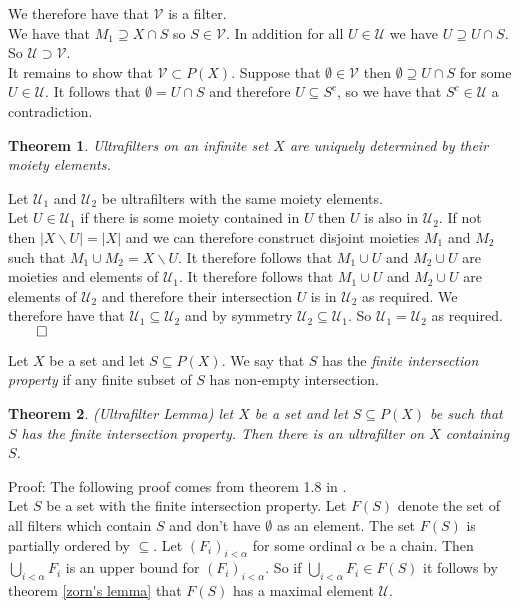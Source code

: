 \documentclass{report}
\newtheorem{theorem}{Theorem}[section]
\newenvironment{defn}[1][]{\refstepcounter{theorem}\begin{trivlist}
\item[\hskip \labelsep {\bfseries Definition  \thetheorem  \, \def\temp{#1}\ifx\temp\empty  #1\else  (#1)\fi
}]}   {\end{trivlist}}
\begin{document}
We therefore have that $\mathcal{V}$ is a filter.\\
We have that $M_1 \supseteq X\cap S$ so $S \in \mathcal{V}$. In addition for all $U\in \mathcal{U}$ we have $U\supseteq U\cap S$. So $\mathcal{U} \supset \mathcal{V}$.\\
It remains to show that $\mathcal{V} \subset P(X)$. Suppose that $\emptyset \in \mathcal{V}$ then $\emptyset \supseteq U\cap S$ for some $U\in \mathcal{U}$. It follows that $\emptyset = U\cap S$ and therefore $U\subseteq S^c$, so we have that $S^c\in \mathcal{U}$ a contradiction.
\begin{theorem}\label{moiety determined}
Ultrafilters on an infinite set $X$ are uniquely determined by their moiety elements.
\end{theorem}\par
Let $\mathcal{U}_1$ and $\mathcal{U}_2$ be ultrafilters with the same moiety elements.\\
Let $U \in \mathcal{U}_1$ if there is some moiety contained in $U$ then $U$ is also in $\mathcal{U}_2$. If not then $\vert X \backslash U \vert = \vert X \vert$ and we can therefore construct disjoint moieties $M_1$ and $M_2$ such that $M_1 \cup M_2 = X \backslash U $. It therefore follows that $M_1 \cup U$ and $M_2 \cup U$ are moieties and elements of $\mathcal{U}_1$. It therefore follows that $M_1 \cup U$ and $M_2 \cup U$ are elements of $\mathcal{U}_2$ and therefore their intersection $U$ is in $\mathcal{U}_2$ as required. We therefore have that $\mathcal{U}_1 \subseteq \mathcal{U}_2$ and by symmetry $\mathcal{U}_2 \subseteq \mathcal{U}_1$. So $\mathcal{U}_1 = \mathcal{U}_2$ as required. $\qed$
\begin{defn}
Let $X$ be a set and let $S \subseteq P(X)$. We say that $S$ has the \textit{finite intersection property} if any finite subset of $S$ has non-empty intersection.
\end{defn}
\begin{theorem}\label{ultrafilter lemma}
(Ultrafilter Lemma) let $X$ be a set and let $S \subseteq P(X)$ be such that $S$ has the finite intersection property. Then there is an ultrafilter on $X$ containing $S$.
\end{theorem}\par
Proof: The following proof comes from theorem 1.8 in \cite{no ultrafilters}.\\ Let $S$ be a set with the finite intersection property. Let $F(S)$ denote the set of all filters which contain $S$ and don't have $\emptyset$ as an element. The set $F(S)$ is partially ordered by $\subseteq$. Let $(F_i)_{i<\alpha}$ for some ordinal $\alpha$ be a chain. Then $\bigcup_{i<\alpha} F_i$ is an upper bound for $(F_i)_{i<\alpha}$. So if $\bigcup_{i<\alpha} F_i \in F(S)$ it follows by theorem \ref{zorn's lemma} that $F(S)$ has a maximal element $\mathcal{U}$.\\
\end{document}
